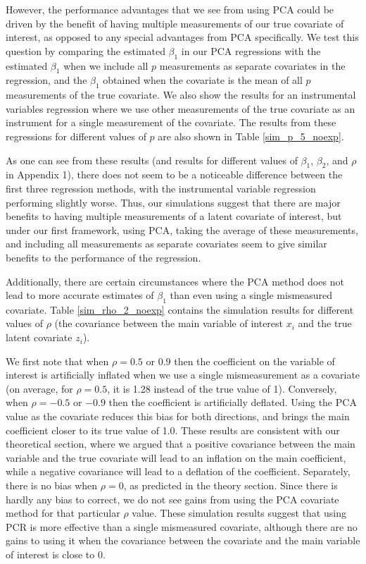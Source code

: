 \documentclass[10pt]{article}
\begin{document}
However, the performance advantages that we see from using PCA could be driven by the benefit of having multiple measurements of our true covariate of interest, as opposed to any special advantages from PCA specifically. We test this question by comparing the estimated $\beta_1$ in our PCA regressions with the estimated $\beta_1$ when we include all $p$ measurements as separate covariates in the regression, and the $\beta_1$ obtained when the covariate is the mean of all $p$ measurements of the true covariate. We also show the results for an instrumental variables regression where we use other measurements of the true covariate as an instrument for a single measurement of the covariate. The results from these regressions for different values of $p$ are also shown in Table \ref{sim_p_5_noexp}.

As one can see from these results (and results for different values of $\beta_1$, $\beta_2$, and $\rho$ in Appendix 1), there does not seem to be a noticeable difference between the first three regression methods, with the instrumental variable regression performing slightly worse. Thus, our simulations suggest that there are major benefits to having multiple measurements of a latent covariate of interest, but under our first framework, using PCA, taking the average of these measurements, and including all measurements as separate covariates seem to give similar benefits to the performance of the regression.

Additionally, there are certain circumstances where the PCA method does not lead to more accurate estimates of $\beta_1$ than even using a single mismeasured covariate. Table \ref{sim_rho_2_noexp} contains the simulation results for different values of $\rho$ (the covariance between the main variable of interest $x_i$ and the true latent covariate $z_i$).



We first note that when $\rho = 0.5$ or $0.9$ then the coefficient on the variable of interest is artificially inflated when we use a single mismeasurement as a covariate (on average, for $\rho = 0.5$, it is 1.28 instead of the true value of 1). Conversely, when $\rho = -0.5$ or $-0.9$ then the coefficient is artificially deflated. Using the PCA value as the covariate reduces this bias for both directions, and brings the main coefficient closer to its true value of 1.0. These results are consistent with our theoretical section, where we argued that a positive covariance between the main variable and the true covariate will lead to an inflation on the main coefficient, while a negative covariance will lead to a deflation of the coefficient. Separately, there is no bias when $\rho = 0$, as predicted in the theory section. Since there is hardly any bias to correct, we do not see gains from using the PCA covariate method for that particular $\rho$ value. These simulation results suggest that using PCR is more effective than a single mismeasured covariate, although there are no gains to using it when the covariance between the covariate and the main variable of interest is close to $0$.
\end{document}
